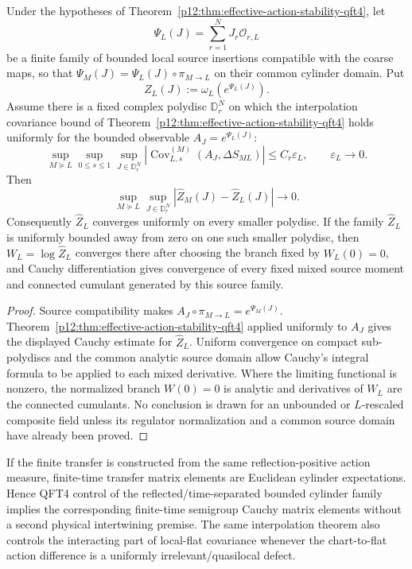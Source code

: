 \documentclass[12pt,a4paper]{article}
\begin{document}
\begin{theorem}
\label{p12:thm:v185-uniform-source-effective-action-stability}
Under the hypotheses of Theorem~\ref{p12:thm:effective-action-stability-qft4},
let
\[
 \Psi_L(J)=\sum_{r=1}^N J_r\mathcal O_{r,L}
\]
be a finite family of bounded local source insertions compatible with the
coarse maps, so that
$\Psi_M(J)=\Psi_L(J)\circ\pi_{M\to L}$ on their common cylinder domain.  Put
\[
 \widehat Z_L(J):=\omega_L(e^{\Psi_L(J)}).
\]
Assume there is a fixed complex polydisc $\mathbb D_r^N$ on which the
interpolation covariance bound of
Theorem~\ref{p12:thm:effective-action-stability-qft4} holds uniformly for the
bounded observable $A_J=e^{\Psi_L(J)}$:
\[
 \sup_{M\succeq L}\sup_{0\le s\le1}\sup_{J\in\mathbb D_r^N}
 \left|\operatorname{Cov}^{(M)}_{L,s}(A_J,\Delta S_{ML})\right|
 \le C_r\varepsilon_L,
 \qquad \varepsilon_L\to0.
\]
Then
\[
 \boxed{
 \sup_{M\succeq L}\sup_{J\in\mathbb D_r^N}
 |\widehat Z_M(J)-\widehat Z_L(J)|\to0.}
\]
Consequently $\widehat Z_L$ converges uniformly on every smaller polydisc.
If the family $\widehat Z_L$ is uniformly bounded away from zero on one
such smaller polydisc, then $W_L=\log\widehat Z_L$ converges there after
choosing the branch fixed by
$W_L(0)=0$, and Cauchy differentiation gives convergence of every fixed mixed
source moment and connected cumulant generated by this source family.
\end{theorem}
\begin{proof}
Source compatibility makes
$A_J\circ\pi_{M\to L}=e^{\Psi_M(J)}$.  Theorem~\ref{p12:thm:effective-action-stability-qft4}
applied uniformly to $A_J$ gives the displayed Cauchy estimate for
$\widehat Z_L$.  Uniform convergence on compact sub-polydiscs and the common
analytic source domain allow Cauchy's integral formula to be applied to each
mixed derivative.  Where the limiting functional is nonzero, the normalized
branch $W(0)=0$ is analytic and derivatives of $W_L$ are the connected
cumulants.  No conclusion is drawn for an unbounded or $L$-rescaled composite
field unless its regulator normalization and a common source domain have
already been proved.
\end{proof}

\begin{remark}
\label{p12:rem:action-first-semigroup-consequence}
If the finite transfer is constructed from the same reflection-positive
action measure, finite-time transfer matrix elements are Euclidean cylinder
expectations.  Hence QFT4 control of the reflected/time-separated bounded
cylinder family implies the corresponding finite-time semigroup Cauchy
matrix elements without a second physical intertwining premise.  The same
interpolation theorem also controls the interacting part of local-flat
covariance whenever the chart-to-flat action difference is a uniformly
irrelevant/quasilocal defect.
\end{remark}
\end{document}
